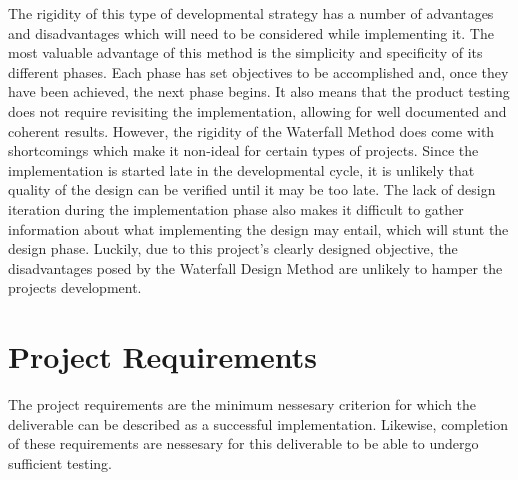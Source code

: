 The rigidity of this type of developmental strategy has a number of advantages and disadvantages which will need to be considered while implementing it. The most valuable advantage of this method is the simplicity and specificity of its different phases. Each phase has set objectives to be accomplished and, once they have been achieved, the next phase begins.  It also means that the product testing does not require revisiting the implementation, allowing for well documented and coherent results. However, the rigidity of the Waterfall Method does come with shortcomings which make it non-ideal for certain types of projects. Since the implementation is started late in the developmental cycle, it is unlikely that quality of the design can be verified until it may be too late. The lack of design iteration during the implementation phase also makes it difficult to gather information about what implementing the design may entail, which will stunt the design phase. Luckily, due to this project’s clearly designed objective, the disadvantages posed by the Waterfall Design Method are unlikely to hamper the projects development. 

\section{Project Requirements}
The project requirements are the minimum nessesary criterion for which the deliverable can be described as a successful implementation. Likewise, completion of these requirements are nessesary for this deliverable to be able to undergo sufficient testing. 

